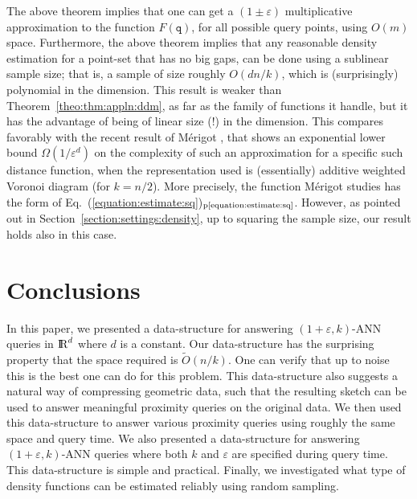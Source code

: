 \documentclass[12pt]{article}
\makeatletter
\newcommand{\Term}[1]{\textsf{#1}}
\newcommand{\TermI}[1]{\Term{#1}\index{#1@\Term{#1}}}
\theoremstyle{remark}{\theorembodyfont{\rm} \newtheorem{remark}[theorem]{Remark}}
\newcommand{\thmref}[1]{Theorem~\ref{theo:#1}}
\newcommand{\Eqrefpage}[1]{Eq.~(\ref{equation:#1})$_\text{p\pageref{equation:#1}}$}
\newcommand{\seclab}[1]{{\label{section:#1}}}
\newcommand{\secref}[1]{Section~\ref{section:#1}}
\newcommand{\pth}[2][\!]{#1\left({#2}\right)}
\newcommand{\eps}{{\varepsilon}}\newcommand{\divides}{|}
\newcommand{\ANN}{\TermI{ANN}\xspace}
\renewcommand{\Re}{{\rm I\!\hspace{-0.025em} R}}
\newcommand{\query}{\mathtt{q}}
\newcommand{\Otilde}{\widetilde{O}}
\newcommand{\hdim}{d}
\providecommand{\Merigot}{M{\' e}rigot}
\makeatother
\begin{document}
The above theorem implies that one can get a $(1\pm\eps)$
multiplicative approximation to the function $F(\query)$, for all
possible query points, using $O(m)$ space. Furthermore, the above
theorem implies that any reasonable density estimation for a point-set
that has no big gaps, can be done using a sublinear sample size; that
is, a sample of size roughly $O( d n/k)$, which is (surprisingly)
polynomial in the dimension. This result is weaker than
\thmref{thm:appln:ddm}, as far as the family of functions it handle,
but it has the advantage of being of linear size (!) in the dimension.
This compares favorably with the recent result of \Merigot{}
\cite{m-lbfkd-13}, that shows an exponential lower bound
$\Omega\pth{1/\eps^{\hdim}}$ on the complexity of such an
approximation for a specific such distance function, when the
representation used is (essentially) additive weighted Voronoi diagram
(for $k=n/2$). More precisely, the function \Merigot{} studies has the
form of \Eqrefpage{estimate:sq}. However, as pointed out in
\secref{settings:density}, up to squaring the sample size, our result
holds also in this case.



\section{Conclusions}
\seclab{conclusions}

In this paper, we presented a data-structure for answering
$(1+\eps,k)$-\ANN queries in $\Re^d$ where $d$ is a constant. Our
data-structure has the surprising property that the space required is
$\Otilde(n/k)$. One can verify that up to noise this is the best one
can do for this problem. This data-structure also suggests a natural
way of compressing geometric data, such that the resulting sketch can
be used to answer meaningful proximity queries on the original
data. We then used this data-structure to answer various proximity
queries using roughly the same space and query time.  We also
presented a data-structure for answering $(1+\eps,k)$-\ANN queries
where both $k$ and $\eps$ are specified during query time. This
data-structure is simple and practical. Finally, we investigated what
type of density functions can be estimated reliably using random
sampling.
\end{document}
